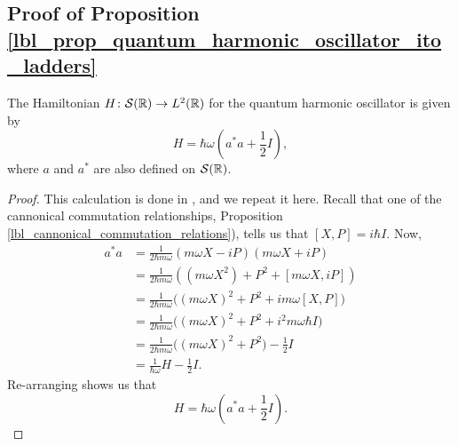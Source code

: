 \subsection{Proof of Proposition \eqref{lbl_prop_quantum_harmonic_oscillator_ito_ladders}}\label{proof_lbl_prop_quantum_harmonic_oscillator_ito_ladders}

\begin{proposition}
  The Hamiltonian $H \colon \mathcal{S}(\mathbb{R}) \to L^2(\mathbb{R})$ for the quantum harmonic oscillator is given by
  \begin{equation*}
    H = \hbar \omega \left(a^* a + \frac{1}{2}I \right),
  \end{equation*}
  where $a$ and $a^*$ are also defined on $\mathcal{S}(\mathbb{R})$.
\end{proposition}
\begin{proof}
  This calculation is done in {\cite[p.229]{Hall2013}}, and we repeat it here. Recall that one of the cannonical commutation relationships, Proposition \eqref{lbl_cannonical_commutation_relations}), tells us that $[X, P] = i \hbar I$. Now,
  \begin{align*}
    a^* a
    &= \frac{1}{2\hbar m \omega } (m \omega X - i P) (m \omega X + i P) \\
    &= \frac{1}{2 \hbar m \omega}\left( (m\omega X^2) + P^2 + [m \omega X, i P] \right) \\
    &= \frac{1}{2\hbar m \omega } \big( (m \omega X)^2 + P^2 + i m \omega [X, P] \big) \\
    &= \frac{1}{2\hbar m \omega } \big( (m \omega X)^2 + P^2 + i^2 m \omega \hbar I \big) \\
    &=\frac{1}{2\hbar m \omega } \big( (m \omega X)^2 + P^2 \big) - \frac{1}{2}I \\
    &= \frac{1}{\hbar \omega} H - \frac{1}{2}I.
  \end{align*}
  Re-arranging shows us that
  \begin{equation*}
    H = \hbar \omega \left(a^* a + \frac{1}{2}I \right).
  \end{equation*}
\end{proof}
